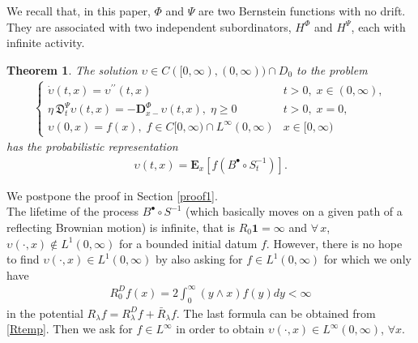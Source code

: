 \documentclass[11pt,a4paper]{article}
\theoremstyle{plain}
\newtheorem{theorem}{Theorem}[section]
\theoremstyle{definition}
\theoremstyle{remark}
\begin{document}
	We recall that, in this paper, \(\Phi\) and \(\Psi\) are two Bernstein functions with no drift. They are associated with two independent subordinators, \(H^\Phi\) and \(H^\Psi\), each with infinite activity.
	\begin{theorem}
		\label{fracdyntm}
		The solution $\upsilon \in C([0,\infty),(0,\infty)) \cap D_0$ to the problem
		\begin{align*}
			\begin{cases}
				\displaystyle 	\dot{\upsilon}(t,x)= \upsilon^{\prime \prime}(t,x) & t>0,\; x \in (0,\infty),\\
				\displaystyle 	\eta\, \mathfrak{D}_t^\Psi \upsilon(t,x) = -\mathbf{D}_{x-}^\Phi \upsilon(t,x), \; \eta \geq 0    & t>0,\; x=0,\\
				\displaystyle 	\upsilon(0,x)=f(x), \; f \in C[0,\infty) \cap L^\infty(0, \infty)  &x\in [0, \infty)
			\end{cases}
		\end{align*}
		has the probabilistic representation
		\begin{align}
			\label{NLstickyBpallino}
			\upsilon(t,x)=\mathbf{E}_x\left[f(B^\bullet \circ S_t^{-1})\right].
		\end{align}
	\end{theorem}
	We postpone the proof in Section \ref{proof1}.\\
	
	
	The lifetime of the process $B^\bullet \circ S^{-1}$ (which basically moves on a given path of a reflecting Brownian motion) is infinite, that is $R_0 \mathbf{1}=\infty$ and $\forall \, x$, $\upsilon(\cdot, x) \notin L^1(0,\infty)$ for a bounded initial datum $f$. However, there is no hope to find $\upsilon(\cdot,x) \in L^1(0,\infty)$ by also asking for $f \in L^1(0,\infty)$ for which we only have 
	\begin{align*}
		R_0^D f(x)= 2 \int_0^\infty (y\wedge x) f(y) dy < \infty 
	\end{align*}
	in the potential $R_\lambda f =R_\lambda^D f+ \bar{R}_\lambda f$.
	The last formula can be obtained from \eqref{Rtemp}. Then we ask for $f \in L^\infty$ in order to obtain $\upsilon (\cdot,x) \in L^\infty(0,\infty)$, $\forall x$.
	
\end{document}
